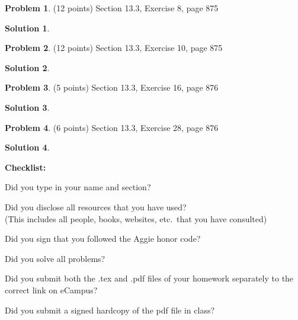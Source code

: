 \documentclass{article}
\theoremstyle{definition}
\newtheorem{problem}{Problem}
\newtheorem*{solution}{Solution}
\newcommand{\checklist}{\noindent\textbf{Checklist:}
\begin{compactitem}[$\Box$] 
\item Did you type in your name and section? 
\item Did you disclose all resources that you have used? \\
(This includes all people, books, websites, etc.\ that you have consulted)
\item Did you sign that you followed the Aggie honor code? 
\item Did you solve all problems? 
\item Did you submit both the .tex and .pdf files of your homework separately 
to the correct link on eCampus?
\item Did you submit a signed hardcopy of the pdf file in class? 
\end{compactitem}
}
\begin{document}
\begin{problem} (12 points)
Section 13.3, Exercise 8, page 875
\end{problem}
\begin{solution} 
\end{solution}

\begin{problem} (12 points)
Section 13.3, Exercise 10, page 875
\end{problem}
\begin{solution} 
\end{solution}

\begin{problem} (5 points)
Section 13.3, Exercise 16, page 876
\end{problem}
\begin{solution} 
\end{solution}

\begin{problem} (6 points)
Section 13.3, Exercise 28, page 876
\end{problem}
\begin{solution} 
\end{solution}

\goodbreak
\checklist
\end{document}
